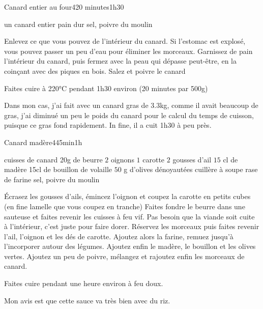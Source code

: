 \begin{recette}{Canard entier au four}{4}{20 minutes}{1h30}
\begin{ingredients}
\ingredient un canard entier
\ingredient pain dur
\ingredient sel, poivre du moulin
\end{ingredients}

\begin{preparation}
\etape Enlevez ce que vous pouvez de l'intérieur du canard. Si l'estomac est explosé, vous pouvez passer un peu d'eau pour éliminer les morceaux.
\etape Garnissez de pain l'intérieur du canard, puis fermez avec la peau qui dépasse peut-être, en la coinçant avec des piques en bois.
\etape Salez et poivre le canard
\end{preparation}

\begin{cuisson}
Faites cuire à 220°C pendant 1h30 environ (20 minutes par 500g)

Dans mon cas, j'ai fait avec un canard gras de 3.3kg, comme il avait beaucoup de gras, j'ai diminué un peu le poids du canard pour le calcul du temps de cuisson, puisque ce gras fond rapidement. In fine, il a cuit 1h30 à peu près.
\end{cuisson}
\end{recette}

\begin{recette}{Canard madère}{4}{45min}{1h}

\begin{ingredients}
 cuisses de canard
\ingredient 20g de beurre
\ingredient $2$ oignons
\ingredient $1$ carotte
\ingredient $2$ gousses d'ail
\ingredient $15$ cl de madère
\ingredient 15cl de bouillon de volaille
\ingredient $50$ g d'olives dénoyautées
 cuillère à soupe rase de farine
\ingredient sel, poivre du moulin
\end{ingredients}

\begin{preparation}
\etape Écrasez les gousses d'ails, émincez l'oignon et coupez la carotte en petits cubes (en fine lamelle que vous coupez en tranche)
\etape Faites fondre le beurre dans une sauteuse et faites revenir les cuisses à feu vif. Pas besoin que la viande soit cuite à l'intérieur, c'est juste pour faire dorer.
\etape Réservez les morceaux puis faites revenir l'ail, l'oignon et les dés de carotte.
\etape Ajoutez alors la farine, remuez jusqu'à l'incorporer autour des légumes. Ajoutez enfin le madère, le bouillon et les olives vertes. Ajoutez un peu de poivre, mélangez et rajoutez enfin les morceaux de canard.
\end{preparation}

\begin{cuisson}
Faites cuire pendant une heure environ à feu doux.
\end{cuisson}


\begin{remarque}
Mon avis est que cette sauce va très bien avec du riz.
\end{remarque}

\end{recette}

